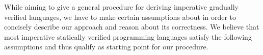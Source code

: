 \begin{comment}
    \begin{alignat*}{3}
    	 & \rlap{\textbf{Syntax}}                                              &  &                       & ~ \\
    	 & \grad{s}                                                            &  & \in \setGStmt         &  \\
    	 & \grad{\phi}                                                         &  & \in \setGFormula      &  \\
    	 &  \\
    	 & \rlap{\textbf{Program State}}                                       &  &                       &  \\
    	 & \grad{\pi}                                                          &  & \in \setGProgramState &  \\
    	 &  \\
    	 & \rlap{\textbf{Semantics}}                                           &  &                       &  \\
    	 & \rlap{Static  ~~~~$\gthoare{}{\grad{\phi}}{\grad{s}}{\grad{\phi}}$} &  &                       &  \\
    	 & \rlap{Dynamic ~$\gsstep{\grad{\pi}}{\grad{\pi}}$}                   &  &                       &  \\
    	 & \rlap{Formula ~~$\evalgphiGen{\grad{\pi}}{\grad{\phi}}$}            &  &                       &  \\
    	 & ~ \\
    	 & \rlap{\textbf{Soundness}}                                           &  &                       &
    \end{alignat*}
\end{comment}



While aiming to give a general procedure for deriving imperative gradually verified languages, we have to make certain assumptions about \svl in order to concisely describe our approach and reason about its correctness.
We believe that most imperative statically verified programming languages satisfy the following assumptions and thus qualify as starting point for our procedure.

